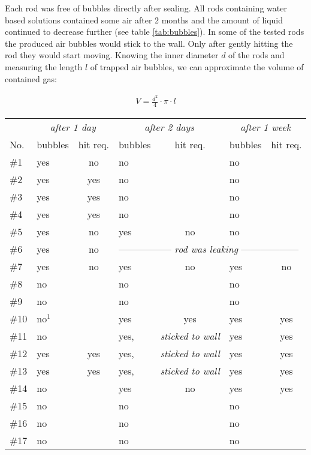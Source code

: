 Each rod was free of bubbles directly after sealing.
All rods containing water based solutions contained some air after 2 months and the amount of liquid continued to decrease further (see table \ref{tab:bubbles}).
In some of the tested rods the produced air bubbles would stick to the wall. Only after gently hitting the rod they would start moving.
Knowing the inner diameter $d$ of the rods and measuring the length $l$ of trapped air bubbles, we can approximate the volume of contained gas:

\begin{align}
 V = \frac{d^2}{4}\cdot \pi \cdot l
\end{align}

\begin{table}[]
\centering
\begin{tabular}{l|lc|lc|lc}
    & \multicolumn{2}{c}{\textit{after 1 day}} 	& \multicolumn{2}{c}{\textit{after 2 days}}	& \multicolumn{2}{c}{\textit{after 1 week}}	\\ 
No. & bubbles	& hit req.	& bubbles 	& hit req.	& bubbles 	& hit req.	\\
\toprule
\#1   & yes	& no		& no		&		& no		&		\\
\#2   & yes	& yes		& no		&		& no		&		\\
\#3   & yes	& yes		& no		&		& no		&		\\
\#4   & yes	& yes		& no		&		& no		&		\\
\#5   & yes	& no		& yes		& no		& no		&		\\
\#6   & yes	& no		& \multicolumn{4}{l}{-----------------\textit{ rod was leaking }------------------}	\\
\#7   & yes	& no		& yes		& no		& yes		& no		\\
\#8   & no	&		& no		&		& no		&		\\
\#9   & no	&		& no		&		& no		&		\\
\#10  & no$^1$	&		& yes		& yes		& yes		& yes		\\
\#11  & no	&		& yes,		& \textit{sticked to wall} &	 yes	& yes\\
\#12  & yes	& yes		& yes,		& \textit{sticked to wall} &	 yes	& yes\\
\#13  & yes	& yes		& yes,		& \textit{sticked to wall} &	 yes	& yes\\
\#14  & no	&   		& yes		& no		& yes		& yes		\\
\#15  & no	&   		& no		&		& no		&		\\
\#16  & no	&   		& no		&		& no		&		\\
\#17  & no	&   		& no		&		& no		&		\\

\end{tabular}
\end{table}
